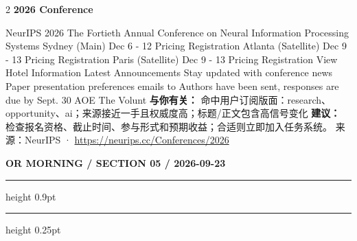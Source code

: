 \documentclass[10.5pt]{ctexart}
\begin{document}
\begin{multicols}{2}
{\large\bfseries 2026 Conference}\par
NeurIPS 2026 The Fortieth Annual Conference on Neural Information Processing Systems Sydney (Main) Dec 6 - 12 Pricing Registration Atlanta (Satellite) Dec 9 - 13 Pricing Registration Paris (Satellite) Dec 9 - 13 Pricing Registration View Hotel Information Latest Announcements Stay updated with conference news Paper presentation preferences emails to Authors have been sent, responses are due by Sept. 30 AOE The Volunt
\textbf{与你有关：} 命中用户订阅版面：research、opportunity、ai；来源接近一手且权威度高；标题/正文包含高信号变化
\textbf{建议：} 检查报名资格、截止时间、参与形式和预期收益；合适则立即加入任务系统。
{\footnotesize\color{ormuted} 来源：NeurIPS · \url{https://neurips.cc/Conferences/2026}}
\end{multicols}
\newpage
{\small\bfseries OR MORNING / SECTION 05 / 2026-09-23}
\vspace{2mm}
\hrule height 0.9pt
\vspace{1.5mm}
\hrule height 0.25pt
\vspace{4mm}
\end{document}
